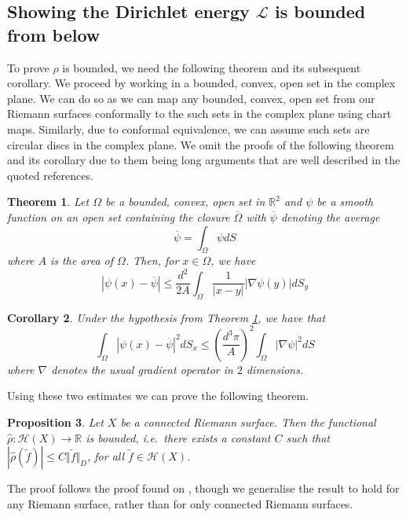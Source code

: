 \documentclass[11pt]{report}
\newtheorem{thm}{Theorem}[section]
\newtheorem{prop}[thm]{Proposition}
\newtheorem{cor}[thm]{Corollary}
\theoremstyle{definition}
\begin{document}
\subsection{Showing the Dirichlet energy $\mathcal{L}$ is bounded from below}
To prove $\hat{\rho}$ is bounded, we need the following theorem and its subsequent corollary. We proceed by working in a bounded, convex, open set in the complex plane. We can do so as we can map any bounded, convex, open set from our Riemann surfaces conformally to the such sets in the complex plane using chart maps. Similarly, due to conformal equivalence, we can assume such sets are circular discs in the complex plane. We omit the proofs of the following theorem and its corollary due to them being long arguments that are well described in the quoted references.
\begin{thm}\cite[Theorem 11]{donaldson}\label{quotedTheorem11}
  Let $\Omega$ be a bounded, convex, open set in $\mathbb{R}^2$ and $\psi$ be a smooth function on an open set containing the closure $\overline{\Omega}$ with $\overline{\psi}$ denoting the average 
  \[\overline{\psi} = \int_{\Omega}\psi dS\] 
  where $A$ is the area of $\Omega$. Then, for $x \in \Omega$, we have 
  \[|\psi(x) - \overline{\psi}| \leq \frac{d^2}{2A}\int_\Omega \frac{1}{|x - y|}|\nabla\psi(y)|dS_y\]
\end{thm}
\begin{cor}\cite[Corollary 6]{donaldson}\label{quotedCorollary6}
  Under the hypothesis from Theorem \ref{quotedTheorem11}, we have that 
  \[\int_\Omega |\psi(x) - \overline{\psi}|^2 dS_x\leq \left(\frac{d^3\pi}{A}\right)^2\int_\Omega |\nabla\psi|^2 dS\]
  where $\nabla$ denotes the usual gradient operator in $2$ dimensions.
\end{cor}
Using these two estimates we can prove the following theorem.
\begin{prop}\label{PartitionOfUnity}
  Let $X$ be a connected Riemann surface. Then the functional $\hat{\rho}:\mathcal{H}(X) \rightarrow \mathbb{R}$ is bounded, i.e.\ there exists a constant $C$ such that $|\hat{\rho}(\tilde{f})|  \leq C \Vert \tilde{f} \Vert_D$, for all $\tilde{f} \in \mathcal{H}(X)$.
\end{prop}
The proof follows the proof found on \cite[p.125]{donaldson}, though we generalise the result to hold for any Riemann surface, rather than for only connected Riemann surfaces.
\end{document}
